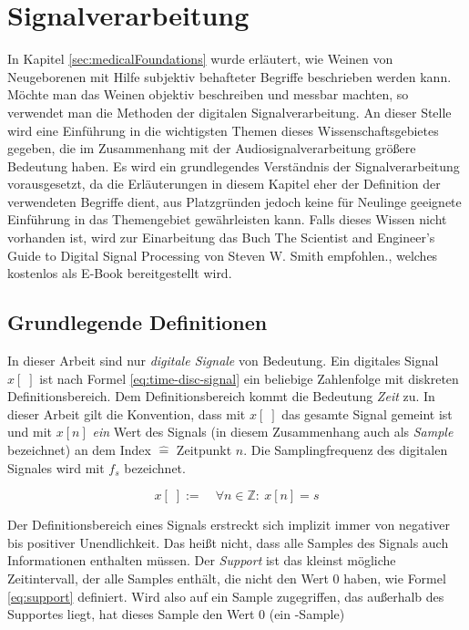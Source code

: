 \section{Signalverarbeitung}
\label{sec:signal_foundations}

In Kapitel \ref{sec:medicalFoundations} wurde erläutert, wie Weinen von Neugeborenen mit Hilfe subjektiv behafteter Begriffe beschrieben werden kann. Möchte man das Weinen objektiv beschreiben und messbar machten, so verwendet man die Methoden der digitalen Signalverarbeitung. An dieser Stelle wird eine Einführung in die wichtigsten Themen dieses Wissenschaftsgebietes gegeben, die im Zusammenhang mit der Audiosignalverarbeitung größere Bedeutung haben. Es wird ein grundlegendes Verständnis der Signalverarbeitung vorausgesetzt, da die Erläuterungen in diesem Kapitel eher der Definition der verwendeten Begriffe dient, aus Platzgründen jedoch keine für Neulinge geeignete Einführung in das Themengebiet gewährleisten kann. Falls dieses Wissen nicht vorhanden ist, wird zur Einarbeitung das Buch \glqq The Scientist and Engineer's Guide to Digital Signal Processing\grqq{} von Steven W. Smith empfohlen.\cite{dspGuide}, welches kostenlos als E-Book bereitgestellt wird.

\subsection{Grundlegende Definitionen}

In dieser Arbeit sind nur \emph{digitale Signale} von Bedeutung. Ein digitales Signal $x[\;]$ ist nach Formel \ref{eq:time-disc-signal} ein beliebige Zahlenfolge mit diskreten Definitionsbereich. Dem Definitionsbereich kommt die Bedeutung \emph{Zeit} zu.\cite[S. 11-12]{dspGuide} In dieser Arbeit gilt die Konvention, dass mit $x[\;]$ das gesamte Signal gemeint ist und mit $x[n]$ \emph{ein} Wert des Signals (in diesem Zusammenhang auch als \emph{Sample} bezeichnet) an dem Index $\hat{=}$ Zeitpunkt $n$. Die Samplingfrequenz des digitalen Signales wird mit $f_s$ bezeichnet.

\begin{equation}
x[\;] := \quad  \forall n \in \mathbb{Z} :\ x[n] = s
\label{eq:time-disc-signal}
\end{equation}

Der Definitionsbereich eines Signals erstreckt sich implizit immer von negativer bis positiver Unendlichkeit. Das heißt nicht, dass alle Samples des Signals auch Informationen enthalten müssen. Der \emph{Support} ist das kleinst mögliche Zeitintervall, der alle Samples enthält, die nicht den Wert 0 haben, wie Formel \ref{eq:support} definiert. Wird also auf ein Sample zugegriffen, das außerhalb des Supportes liegt, hat dieses Sample den Wert 0 (ein -Sample\grqq )\cite[S. 24]{dspMichigan}


